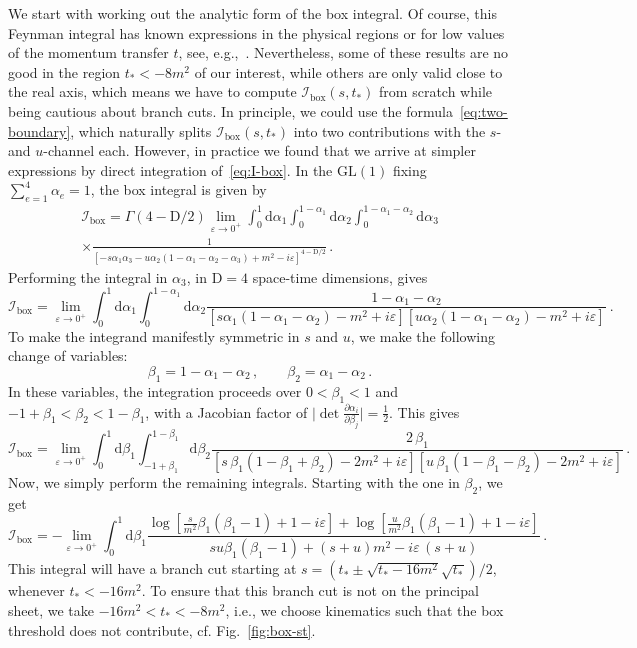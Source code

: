 \documentclass[12pt]{article}
\numberwithin{figure}{section}
\def \be {\begin{equation}}
\def \ee {\end{equation}}
\def \D {\mathrm{D}}
\def \d {\mathrm{d}}
\def \eps {\varepsilon}
\def \I {\mathcal{I}}
\def \GL {\mathrm{GL}}
\def \boxx {\mathrm{box}}
\begin{document}
    We start with working out the analytic form of the box integral.
    Of course, this Feynman integral has known expressions in the physical regions or for low values of the momentum transfer $t$, see, e.g.,~\cite{karplus1951scattering,tHooft:1978jhc,Davydychev:1993ut}. Nevertheless, some of these results are no good in the region $t_\ast < -8m^2$ of our interest, while others are only valid close to the real axis, which means we have to compute $\I_{\boxx}(s,t_\ast)$ from scratch while being cautious about branch cuts. In principle, we could use the formula~\eqref{eq:two-boundary}, which naturally splits $\I_{\boxx}(s,t_\ast)$ into two contributions with the $s$- and $u$-channel each. However, in practice we found that we arrive at simpler expressions by direct integration of~\eqref{eq:I-box}.
    In the $\GL(1)$ fixing $\sum_{e=1}^4 \alpha_e = 1$, the box integral is given by
    \begin{multline}
        \I_\boxx = \Gamma\left(4-\D/2\right) \lim_{\eps \to 0^+} \int_0^1 \d \alpha_1 \int_0^{1-\alpha_1} \d \alpha_2 \int_0^{1-\alpha_1-\alpha_2} \d\alpha_3 \\ 
        \times \frac{1}{\left[ -s \alpha_1 \alpha_3 - u \alpha_2 (1 - \alpha_1 - \alpha_2 - \alpha_3) + m^2-i \varepsilon \right]^{4-\D/2}}\,.
    \end{multline}
    Performing the integral in $\alpha_3$,
    in $\D=4$ space-time dimensions, gives
    \be
        \I_\boxx = \lim_{\eps \to 0^+} \int_0^1 \d \alpha_1 \int_0^{1-\alpha_1} \!\!\d\alpha_2 \frac{1-\alpha_1-\alpha_2}{\left[s \alpha_1 (1{-}\alpha_1{-}\alpha_2) - m^2 + i\eps \right]\left[u \alpha_2 (1{-}\alpha_1{-}\alpha_2) - m^2 + i\eps \right]}\ .
    \ee
    To make the integrand manifestly symmetric in $s$ and $u$, we make the following change of variables: 
    \be
    \beta_1 = 1-\alpha_1-\alpha_2 \,, \qquad \beta_2 = \alpha_1-\alpha_2 \,.
    \ee
    In these variables, the integration proceeds over $0<\beta_1<1$ and $-1{+}\beta_1<\beta_2<1{-}\beta_1$, with a Jacobian factor of $\vert \det \frac{\partial \alpha_i}{\partial \beta_j} \vert = \frac{1}{2}$. This gives
    \be
    \I_\boxx = \lim_{\eps \to 0^+} \int_0^1 \d \beta_1 \int_{-1+\beta_1}^{1-\beta_1} \!\! \d \beta_2
        \frac{2\,\beta_1}{\left[s \, \beta_1 (1{-}\beta_1{+}\beta_2) - 2 m^2 + i\eps \right] \left[u \, \beta_1 (1{-}\beta_1{-}\beta_2) - 2 m^2 + i\eps \right]} \,.
    \ee 
    Now, we simply perform the remaining integrals. Starting with the one in $\beta_2$, we get
    \be 
        \I_\boxx = -
        \lim_{\eps \to 0^+} \int_0^1 \d \beta_1
        \frac{\log\left[\frac{s}{m^2} \beta_1 \left(\beta_1-1\right)+ 1 - i \eps \right]+\log\left[\frac{u}{m^2} \beta_1 \left(\beta_1 -1\right)+ 1 - i \eps \right]}{s u \beta_1\left( \beta_1 - 1\right) + (s+u) m^2 -i \eps\, (s+u)} \,.
    \ee
    This integral will have a branch cut starting at $s= (t_\ast \pm \sqrt{t_\ast-16m^2} \sqrt{t_\ast})/2$, whenever $t_\ast<-16 m^2$. To ensure that this branch cut is not on the principal sheet, we take $-16 m^2 < t_\ast < -8 m^2$, i.e., we choose kinematics such that the box threshold does not contribute, cf. Fig.~\ref{fig:box-st}.
    
\end{document}
